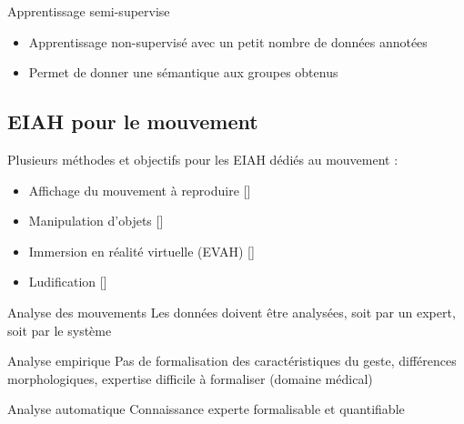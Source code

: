 \documentclass[svgnames]{beamer}
\newcommand{\mycite}[1]{[\textit{\cite{#1}}]}
\begin{document}
	\begin{frame}{\subsecname}
		\begin{block}{Apprentissage semi-supervise}
			\begin{itemize}[label=$-$]
				\item Apprentissage non-supervisé avec un petit nombre de données annotées
				\item Permet de donner une sémantique aux groupes obtenus
			\end{itemize}
		\end{block}
	\end{frame}
	
	\subsection{EIAH pour le mouvement}
	\begin{frame}{\subsecname}
		Plusieurs méthodes et objectifs pour les EIAH dédiés au mouvement :
		\begin{itemize}[label=$\bullet$]
			\item Affichage du mouvement à reproduire \mycite{Kora20151559}
			\item Manipulation d'objets \mycite{Chellali2016Aia}
			\item Immersion en réalité virtuelle (EVAH) \mycite{Baldominos2015AAt}
			\item Ludification \mycite{Alankus2010TCG}
		\end{itemize}

		\vspace{1cm}
	\end{frame}
	
	 \begin{frame}{Analyse des mouvements}
	 	Les données doivent être analysées, soit par un expert, soit par le système

		\begin{block}{Analyse empirique}
			Pas de formalisation des caractéristiques du geste, différences morphologiques, expertise difficile à formaliser (domaine médical)
		\end{block}
		
		\begin{block}{Analyse automatique}
			Connaissance experte formalisable et quantifiable
		\end{block}
	 \end{frame}

	
\end{document}
